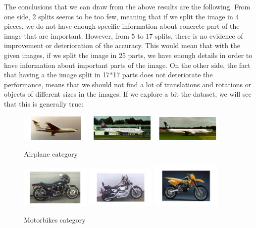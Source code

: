 The conclusions that we can draw from the above results are the following. From one side, 2 splits seems to be too few, meaning that if we split the image in 4 pieces, we do not have enough specific information about concrete part of the image that are important. However, from 5 to 17 splits, there is no evidence of improvement or deterioration of the accuracy. This would mean that with the given images, if we split the image in 25 parts, we have enough details in order to have information about important parts of the image. On the other side, the fact that having a the image split in 17*17 parts does not deteriorate the performance, means that we should not find a lot of translations and rotations or objects of different sizes in the images. If we explore a bit the dataset, we will see that this is generally true: 


\begin{figure}[H]
    \centering
    \includegraphics[width=0.3\textwidth]{Images/airplane_1.jpg}
    \includegraphics[width=0.3\textwidth]{Images/airplane_2.jpg}
    \includegraphics[width=0.3\textwidth]{Images/airplane_3.jpg}
    \caption{Airplane category}
    \label{fig:airplane}
\end{figure}

\begin{figure}[H]
    \centering
    \includegraphics[width=0.3\textwidth]{Images/moto1.jpg}
    \includegraphics[width=0.3\textwidth]{Images/moto2.jpg}
    \includegraphics[width=0.3\textwidth]{Images/moto3.jpg}
    \caption{Motorbikes category}
    \label{fig:moto}
\end{figure}

